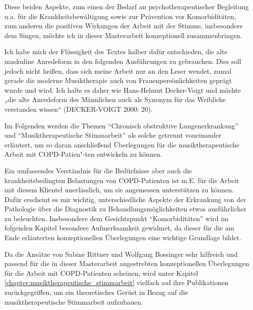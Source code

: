 Diese beiden Aspekte, zum einen der Bedarf an psychotherapeutischer Begleitung u.a. für die Krankheitsbewältigung sowie zur Prävention vor Komorbiditäten, zum anderen die positiven Wirkungen der Arbeit mit der Stimme, insbesondere dem Singen, möchte ich in dieser Masterarbeit konzeptionell zusammenbringen.

Ich habe mich der Flüssigkeit des Textes halber dafür entschieden, die alte maskuline Anredeform in den folgenden Ausführungen zu gebrauchen. Dies soll jedoch nicht heißen, dass sich meine Arbeit nur an den Leser wendet, zumal gerade die moderne Musiktherapie auch von Frauenpersönlichkeiten geprägt wurde und wird. Ich halte es daher wie Hans-Helmut Decker-Voigt und möchte „die alte Anredeform des Männlichen auch als Synonym für das Weibliche verstanden wissen“ (DECKER-VOIGT 2000: 20).

Im Folgenden werden die Themen "`Chronisch obstruktive Lungenerkrankung"' und "`Musiktherapeutische Stimmarbeit"' als solche getrennt voneinander erläutert, um so daran anschließend Überlegungen für die musiktherapeutische Arbeit mit COPD-Patien"-ten entwickeln zu können.

Ein umfassendes Verständnis für die Bedürfnisse aber auch die krankheitsbedingten Belastungen von COPD-Patienten ist m.E. für die Arbeit mit diesem Klientel unerlässlich, um sie angemessen unterstützen zu können. Dafür erscheint es mir wichtig, unterschiedliche Aspekte der Erkrankung von der Pathologie über die Diagnostik zu Behandlungsmöglichkeiten etwas ausführlicher zu beleuchten. Insbesondere dem Gesichtspunkt "`Komorbiditäten"' wird im folgenden Kapitel besondere Aufmerksamkeit gewidmet, da dieser für die am Ende erläuterten konzeptionellen Überlegungen eine wichtige Grundlage bildet.

Da die Ansätze von Sabine Rittner und Wolfgang Bossinger sehr hilfreich und passend für die in dieser Masterarbeit angestrebten konzeptionellen Überlegungen für die Arbeit mit COPD-Patienten scheinen, wird unter Kapitel  \ref{chapter:musiktherapeutische_stimmarbeit} vielfach auf ihre Publikationen zurückgegriffen, um ein theoretisches Gerüst in Bezug auf die musiktherapeutische Stimmarbeit aufzubauen.

